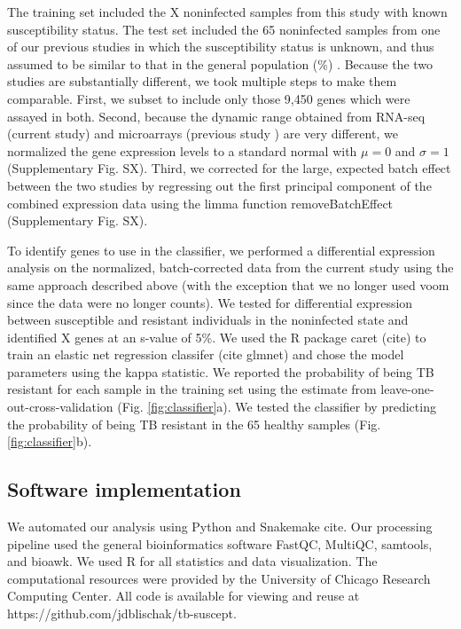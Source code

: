 \documentclass[fleqn,10pt]{wlscirep}
\begin{document}
The training set included the X noninfected samples from this study with known susceptibility status. The test set included the 65 noninfected samples from one of our previous studies in which the susceptibility status is unknown, and thus assumed to be similar to that in the general population (\%) \cite{Barreiro2012}. Because the two studies are substantially different, we took multiple steps to make them comparable. First, we subset to include only those 9,450 genes which were assayed in both. Second, because the dynamic range obtained from RNA-seq (current study) and microarrays (previous study \cite{Barreiro2012}) are very different, we normalized the gene expression levels to a standard normal with $\mu = 0$ and $\sigma = 1$ (Supplementary Fig. SX). Third, we corrected for the large, expected batch effect between the two studies by regressing out the first principal component of the combined expression data using the limma function removeBatchEffect \cite{Ritchie2015} (Supplementary Fig. SX).

To identify genes to use in the classifier, we performed a differential expression analysis on the normalized, batch-corrected data from the current study using the same approach described above (with the exception that we no longer used voom since the data were no longer counts). We tested for differential expression between susceptible and resistant individuals in the noninfected state and identified X genes at an s-value of 5\%. We used the R package caret (cite) to train an elastic net regression classifer (cite glmnet) and chose the model parameters using the kappa statistic. We reported the probability of being TB resistant for each sample in the training set using the estimate from leave-one-out-cross-validation (Fig. \ref{fig:classifier}a). We tested the classifier by predicting the probability of being TB resistant in the 65 healthy samples (Fig. \ref{fig:classifier}b).
\subsection*{Software implementation}

We automated our analysis using Python and Snakemake cite. Our processing pipeline used the general bioinformatics software FastQC, MultiQC, samtools, and bioawk. We used R for all statistics and data visualization. The computational resources were provided by the University of Chicago Research Computing Center. All code is available for viewing and reuse at https://github.com/jdblischak/tb-suscept.
\end{document}
